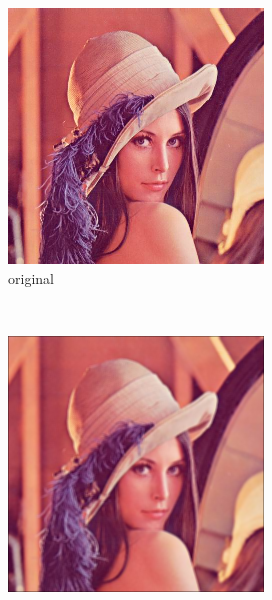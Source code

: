 \documentclass[12pt]{article}
\begin{document}
\begin{figure}[h]\centering
    \begin{subfigure}[t]{.4\textwidth}
        \includegraphics[width=\textwidth]{lenac_small.png}
        \caption{original}
    \end{subfigure}\\[2ex]
    \begin{subfigure}[t]{\subfiguresize}
        \includegraphics[width=\textwidth]{lenac_lowpass1.png}

\end{subfigure}
\end{figure}
\end{document}
